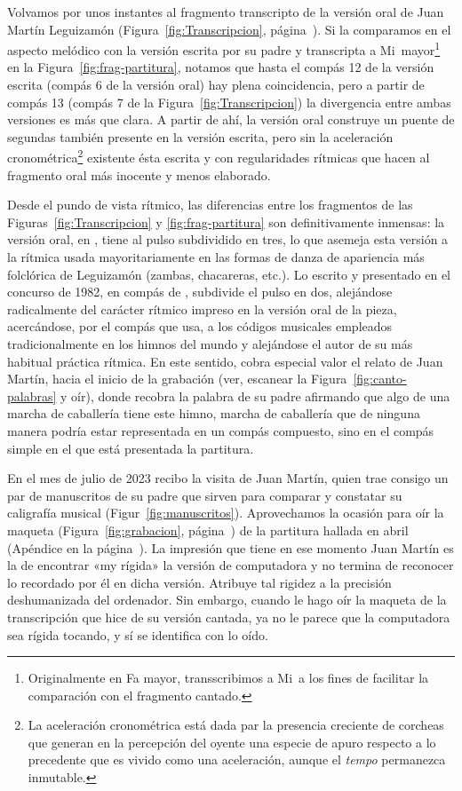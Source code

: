 Volvamos por unos instantes al fragmento transcripto de la versión oral de Juan Martín Leguizamón (Figura~\ref{fig:Transcripcion}, página~\pageref{fig:Transcripcion}). Si la comparamos en el aspecto melódico con la versión escrita por su padre y transcripta a Mi\bemoltxt\ mayor\footnote{Originalmente en Fa mayor, transscribimos a Mi\bemoltxt\ a los fines de facilitar la comparación con el fragmento cantado.} en la Figura~\ref{fig:frag-partitura}, notamos que hasta el compás 12 de la versión escrita (compás 6 de la versión oral) hay plena coincidencia, pero a partir de compás 13 (compás 7 de la Figura~\ref{fig:Transcripcion}) la divergencia entre ambas versiones es más que clara. A partir de ahí, la versión oral construye un puente de segundas  también presente en la versión escrita, pero sin la aceleración cronométrica\footnote{La aceleración cronométrica está dada par la presencia creciente de corcheas que generan en la percepción del oyente una especie de apuro respecto a lo precedente que es vivido como una aceleración, aunque el \emph{tempo} permanezca inmutable.} existente ésta escrita y con regularidades rítmicas que hacen al fragmento oral más inocente y menos elaborado.

Desde el pundo de vista rítmico, las diferencias entre los fragmentos de las Figuras~\ref{fig:Transcripcion} y \ref{fig:frag-partitura} son definitivamente inmensas: la versión oral, en , tiene al pulso subdividido en tres, lo que asemeja esta versión a la rítmica usada mayoritariamente en las formas de danza de apariencia más folclórica de Leguizamón (zambas, chacareras, etc.). Lo escrito y presentado en el concurso de 1982, en compás de , subdivide el pulso en dos, alejándose radicalmente del carácter rítmico impreso en la versión oral de la pieza, acercándose, por el compás que usa, a los códigos musicales empleados tradicionalmente en los himnos del mundo y alejándose el autor de su más habitual práctica rítmica. En este sentido, cobra especial valor el relato de Juan Martín, hacia el inicio de la grabación (ver, escanear la Figura~\ref{fig:canto-palabras} y oír), donde recobra la palabra de su padre afirmando que algo de una marcha de caballería tiene este himno, marcha de caballería que de ninguna manera podría estar representada en un compás compuesto, sino en el compás simple en el que está presentada la partitura.

En el mes de julio de 2023 recibo la visita de Juan Martín, quien trae consigo un par de manuscritos de su padre que sirven para comparar y constatar su caligrafía musical (Figur~\ref{fig:manuscritos}). Aprovechamos la ocasión para oír la maqueta (Figura~\ref{fig:grabacion}, página~\pageref{fig:grabacion}) de la partitura hallada en abril (Apéndice en la página~\pageref{apx:partitura}). La impresión que tiene en ese momento Juan Martín es la de encontrar «my rígida» la versión de computadora y no termina de reconocer lo recordado por él en dicha versión. Atribuye tal rigidez a la precisión deshumanizada del ordenador. Sin embargo, cuando le hago oír la maqueta de la transcripción que hice de su versión cantada, ya no le parece que la computadora sea rígida tocando, y sí se identifica con lo oído.

